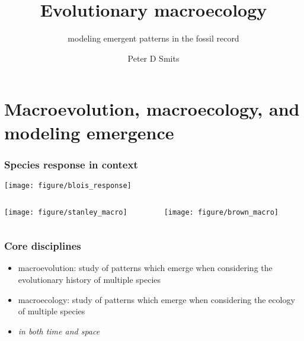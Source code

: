 \documentclass{beamer}
\title{Evolutionary macroecology}
\subtitle{modeling emergent patterns in the fossil record}
\author{Peter D Smits}
\institute{Department of Integrative Biology, University of California -- Berkeley}
\begin{document}
\begin{frame}
  \maketitle
\end{frame}

\begin{frame}
  \tableofcontents
\end{frame}

\section{Macroevolution, macroecology, and modeling emergence}

\begin{frame}
  \frametitle{Species response in context}
  
  \begin{center}
    \texttt{[image: figure/blois\_response]}
  \end{center}
  \tiny{}
\end{frame}

\begin{frame}
  \begin{columns}
    \begin{column}{0.5\textwidth}
      \begin{center}
        \texttt{[image: figure/stanley\_macro]}
      \end{center}
    \end{column}
    \begin{column}{0.5\textwidth}
      \begin{center}
        \texttt{[image: figure/brown\_macro]}
      \end{center}
    \end{column}
  \end{columns}
\end{frame}

\begin{frame}
  \frametitle{Core disciplines}
  \begin{definition}
    \begin{itemize}
      \item \alert{macroevolution}: study of patterns which emerge when considering the evolutionary history of multiple species
      \item \alert{macroecology}: study of patterns which emerge when considering the ecology of multiple species
      \item \emph{in both time and space}
    \end{itemize}
  \end{definition}
\end{frame}
\end{document}
